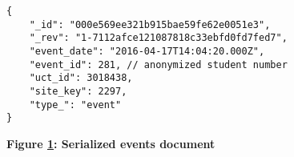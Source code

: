 \begin{figure}[H]
    \centering
    \begin{mdframed}
        \centering
        \begin{verbatim}
{
    "_id": "000e569ee321b915bae59fe62e0051e3",
    "_rev": "1-7112afce121087818c33ebfd0fd7fed7",
    "event_date": "2016-04-17T14:04:20.000Z",
    "event_id": 281, // anonymized student number
    "uct_id": 3018438,
    "site_key": 2297,
    "type_": "event"
}           
        \end{verbatim}
    \end{mdframed}
    \caption[Serialized events document]{\textbf{Figure \ref{fig-json-event}: Serialized events document}}
    \label{fig-json-event}
\end{figure}